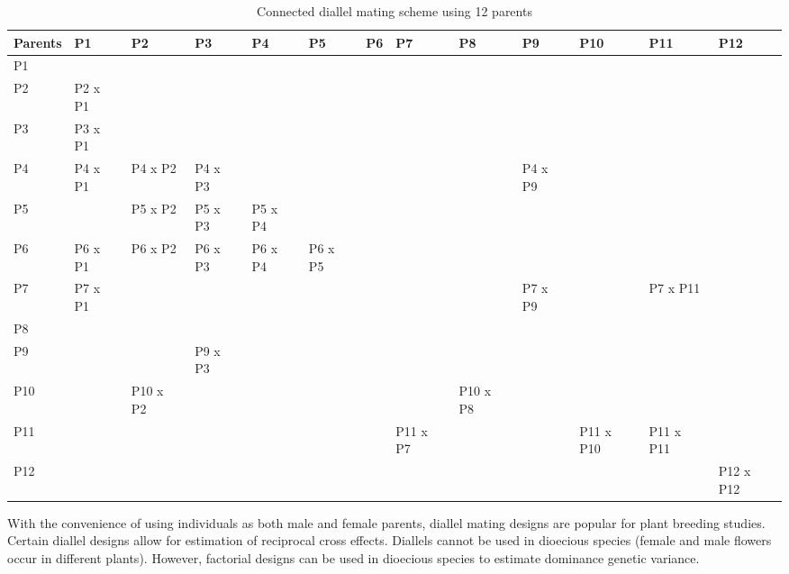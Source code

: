 \documentclass[nofonts,]{tufte-handout}
\begin{document}
\begin{longtable}[t]{>{\raggedright\arraybackslash}p{3.5em}>{\raggedright\arraybackslash}p{3.5em}>{\raggedright\arraybackslash}p{3.5em}>{\raggedright\arraybackslash}p{3.5em}>{\raggedright\arraybackslash}p{3.5em}>{\raggedright\arraybackslash}p{3.5em}>{\raggedright\arraybackslash}p{3.5em}>{\raggedright\arraybackslash}p{3.5em}>{\raggedright\arraybackslash}p{3.5em}>{\raggedright\arraybackslash}p{3.5em}>{\raggedright\arraybackslash}p{3.5em}ll}
\caption{\label{tab:connected-diallel}Connected diallel mating scheme using 12 parents}\\
\toprule
Parents & P1 & P2 & P3 & P4 & P5 & P6 & P7 & P8 & P9 & P10 & P11 & P12\\
\midrule
\rowcolor{gray!6}  P1 &  &  &  &  &  &  &  &  &  &  &  & \\
P2 & P2 x P1 &  &  &  &  &  &  &  &  &  &  & \\
\rowcolor{gray!6}  P3 & P3 x P1 &  &  &  &  &  &  &  &  &  &  & \\
P4 & P4 x P1 & P4 x P2 & P4 x P3 &  &  &  &  &  & P4 x P9 &  &  & \\
\rowcolor{gray!6}  P5 &  & P5 x P2 & P5 x P3 & P5 x P4 &  &  &  &  &  &  &  & \\
\addlinespace
P6 & P6 x P1 & P6 x P2 & P6 x P3 & P6 x P4 & P6 x P5 &  &  &  &  &  &  & \\
\rowcolor{gray!6}  P7 & P7 x P1 &  &  &  &  &  &  &  & P7 x P9 &  & P7 x P11 & \\
P8 &  &  &  &  &  &  &  &  &  &  &  & \\
\rowcolor{gray!6}  P9 &  &  & P9 x P3 &  &  &  &  &  &  &  &  & \\
P10 &  & P10 x P2 &  &  &  &  &  & P10 x P8 &  &  &  & \\
\addlinespace
\rowcolor{gray!6}  P11 &  &  &  &  &  &  & P11 x P7 &  &  & P11 x P10 & P11 x P11 & \\
P12 &  &  &  &  &  &  &  &  &  &  &  & P12 x P12\\
\bottomrule
\end{longtable}
\endgroup{}

With the convenience of using individuals as both male and female
parents, diallel mating designs are popular for plant breeding studies.
Certain diallel designs allow for estimation of reciprocal cross
effects. Diallels cannot be used in dioecious species (female and male
flowers occur in different plants). However, factorial designs can be
used in dioecious species to estimate dominance genetic variance.
\end{document}

